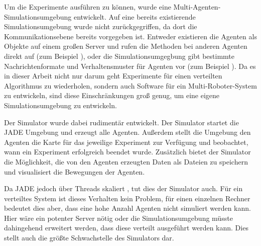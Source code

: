 Um die Experimente ausführen zu können, wurde eine Multi-Agenten-Simulationsumgebung entwickelt. Auf eine bereits existierende Simulationsumgebung wurde nicht zurückgegriffen, da dort die Kommunikationsebene bereits vorgegeben ist. Entweder existieren die Agenten als Objekte auf einem großen Server und rufen die Methoden bei anderen Agenten direkt auf (zum Beispiel \cite{web:marsGroup}), oder die Simulationsumgegbung gibt bestimmte Nachrichtenformate und Verhaltensmuster für Agenten vor (zum Beispiel \cite{web:mass}). Da es in dieser Arbeit nicht nur darum geht Experimente für einen verteilten Algorithmus zu wiederholen, sondern auch Software für ein Multi-Roboter-System zu entwickeln, sind diese Einschränkungen groß genug, um eine eigene Simulationsumgebung zu entwickeln.

Der Simulator wurde dabei rudimentär entwickelt. Der Simulator startet die JADE Umgebung und erzeugt alle Agenten. Außerdem stellt die Umgebung den Agenten die Karte für das jeweilige Experiment zur Verfügung und beobachtet, wann ein Experiment erfolgreich beendet wurde. Zusätzlich bietet der Simulator die Möglichkeit, die von den Agenten erzeugten Daten als Dateien zu speichern und visualisiert die Bewegungen der Agenten.

Da JADE jedoch über Threads skaliert \cite{book:jade}, tut dies der Simulator auch. Für ein verteiltes System ist dieses Verhalten kein Problem, für einen einzelnen Rechner bedeutet dies aber, dass eine hohe Anzahl Agenten nicht simuliert werden kann. Hier wäre ein potenter Server nötig oder die Simulationsumgebung müsste dahingehend erweitert werden, dass diese verteilt ausgeführt werden kann. Dies stellt auch die größte Schwachstelle des Simulators dar.